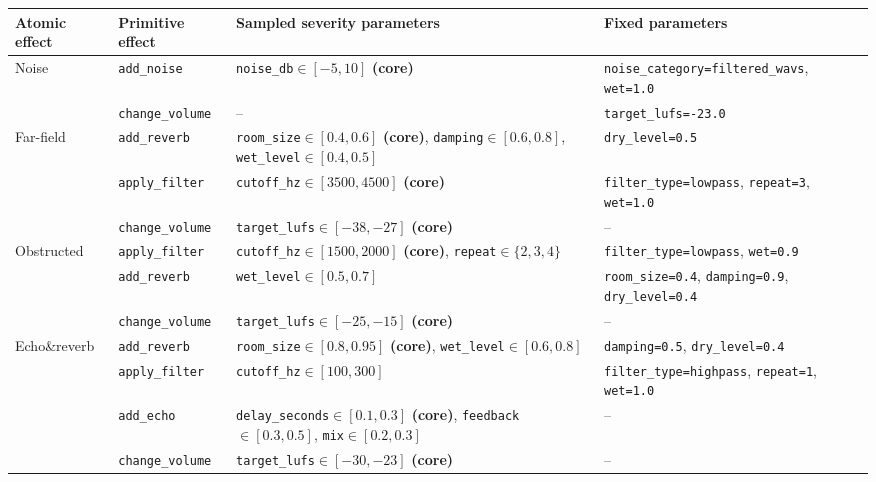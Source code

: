 \documentclass{llmxive}
\providecommand{\arraystretch}{1.05}
\begin{document}
\begin{table}[t]
\centering
\scriptsize
\setlength{\tabcolsep}{3.5pt}
\renewcommand{\arraystretch}{1.18}
\begin{tabular}{p{} p{} p{} p{}}
\toprule
\textbf{Atomic effect} & \textbf{Primitive effect} & \textbf{Sampled severity parameters} & \textbf{Fixed parameters} \\
\midrule

\multirow{2}{*}{Noise}
& \texttt{add\_noise}
& \texttt{noise\_db}$\in[-5,10]$ \textbf{(core)}
& \texttt{noise\_category=filtered\_wavs}, \texttt{wet=1.0} \\
& \texttt{change\_volume}
& --
& \texttt{target\_lufs=-23.0} \\

\midrule
\multirow{3}{*}{Far-field}
& \texttt{add\_reverb}
& \texttt{room\_size}$\in[0.4,0.6]$ \textbf{(core)}, \texttt{damping}$\in[0.6,0.8]$, \texttt{wet\_level}$\in[0.4,0.5]$
& \texttt{dry\_level=0.5} \\
& \texttt{apply\_filter}
& \texttt{cutoff\_hz}$\in[3500,4500]$ \textbf{(core)}
& \texttt{filter\_type=lowpass}, \texttt{repeat=3}, \texttt{wet=1.0} \\
& \texttt{change\_volume}
& \texttt{target\_lufs}$\in[-38,-27]$ \textbf{(core)}
& -- \\

\midrule
\multirow{3}{*}{Obstructed}
& \texttt{apply\_filter}
& \texttt{cutoff\_hz}$\in[1500,2000]$ \textbf{(core)}, \texttt{repeat}$\in\{2,3,4\}$
& \texttt{filter\_type=lowpass}, \texttt{wet=0.9} \\
& \texttt{add\_reverb}
& \texttt{wet\_level}$\in[0.5,0.7]$
& \texttt{room\_size=0.4}, \texttt{damping=0.9}, \texttt{dry\_level=0.4} \\
& \texttt{change\_volume}
& \texttt{target\_lufs}$\in[-25,-15]$ \textbf{(core)}
& -- \\

\midrule
\multirow{4}{*}{Echo\&reverb}
& \texttt{add\_reverb}
& \texttt{room\_size}$\in[0.8,0.95]$ \textbf{(core)}, \texttt{wet\_level}$\in[0.6,0.8]$
& \texttt{damping=0.5}, \texttt{dry\_level=0.4} \\
& \texttt{apply\_filter}
& \texttt{cutoff\_hz}$\in[100,300]$
& \texttt{filter\_type=highpass}, \texttt{repeat=1}, \texttt{wet=1.0} \\
& \texttt{add\_echo}
& \texttt{delay\_seconds}$\in[0.1,0.3]$ \textbf{(core)}, \texttt{feedback}$\in[0.3,0.5]$, \texttt{mix}$\in[0.2,0.3]$
& -- \\
& \texttt{change\_volume}
& \texttt{target\_lufs}$\in[-30,-23]$ \textbf{(core)}
& -- \\


\end{tabular}
\end{table}
\end{document}
